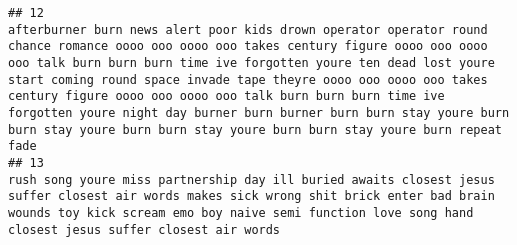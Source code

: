 \documentclass[]{article}
\begin{document}
\begin{verbatim}
## 12                                                                                                                                                                                                                                                                                                                                                                                                                                                                                                                                                                                                                                                                                                                                        afterburner burn news alert poor kids drown operator operator round chance romance oooo ooo oooo ooo takes century figure oooo ooo oooo ooo talk burn burn burn time ive forgotten youre ten dead lost youre start coming round space invade tape theyre oooo ooo oooo ooo takes century figure oooo ooo oooo ooo talk burn burn burn time ive forgotten youre night day burner burn burner burn burn stay youre burn burn stay youre burn burn stay youre burn burn stay youre burn repeat fade
## 13                                                                                                                                                                                                                                                                                                                                                                                                                                                                                                                                                                                                                                                                                                                                                                                                                                                                                                                                                                                      rush song youre miss partnership day ill buried awaits closest jesus suffer closest air words makes sick wrong shit brick enter bad brain wounds toy kick scream emo boy naive semi function love song hand closest jesus suffer closest air words

\end{verbatim}
\end{document}
